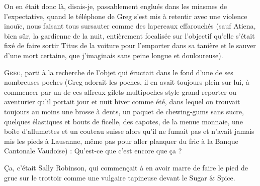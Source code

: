 On en était donc là, disais-je, passablement englués dans les miasmes de l’expectative, quand le téléphone de Greg s’est mis à retentir avec une violence inouïe, nous faisant tous sursauter comme des lapereaux effarouchés (sauf Atiena, bien sûr, la gardienne de la nuit, entièrement focalisée sur l’objectif qu’elle s’était fixé de faire sortir Titus de la voiture pour l’emporter dans sa tanière et le sauver d’une mort certaine, que j’imaginais sans peine longue et douloureuse).

\begin{dialogue}

%
%
%
\textsc{Greg}, parti à la recherche de l’objet qui éructait dans le fond d’une de ses nombreuses poches (Greg adorait les poches, il en avait toujours plein sur lui, à commencer par un de ces affreux gilets multipoches style grand reporter ou aventurier qu’il portait jour et nuit hiver comme été, dans lequel on trouvait toujours au moins une brosse à dents, un paquet de chewing-gums sans sucre, quelques élastiques et bouts de ficelle, des capotes, de la menue monnaie, une boîte d’allumettes et un couteau suisse alors qu’il ne fumait pas et n’avait jamais mis les pieds à Lausanne, même pas pour aller planquer du fric à la Banque Cantonale Vaudoise) : Qu’est-ce que c’est encore que ça ?

\end{dialogue}

Ça, c’était Sally Robinson, qui commençait à en avoir marre de faire le pied de grue sur le trottoir comme une vulgaire tapineuse devant le Sugar \& Spice.

